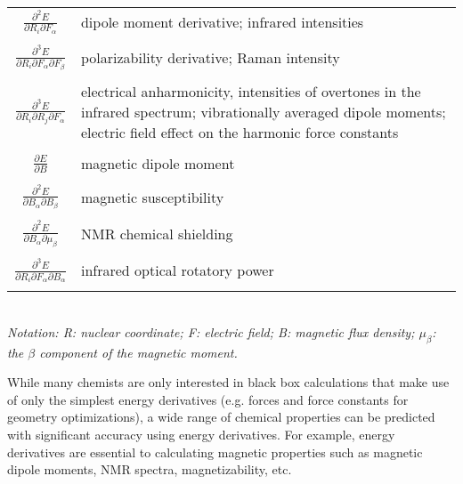\begin{table}
\begin{center}
\begin{tabular} {| c | p{13cm} | }
            $\frac{\partial^2 E}{\partial R_i \partial F_\alpha}$ & dipole moment derivative; infrared intensities \\ & \\
            $\frac{\partial^3 E}{\partial R_i \partial F_\alpha \partial F_\beta}$ & polarizability derivative; Raman intensity \\ & \\
            $\frac{\partial^3 E}{\partial R_i \partial R_j \partial F_\alpha}$ & electrical anharmonicity, intensities of overtones in the infrared spectrum; vibrationally averaged dipole moments; electric field effect on the harmonic force constants \\ & \\
            $\frac{\partial E}{\partial B}$ & magnetic dipole moment \\ & \\
            $\frac{\partial^2 E}{\partial B_\alpha \partial B_\beta}$ & magnetic susceptibility \\ & \\
            $\frac{\partial^2 E}{\partial B_\alpha \partial \mu_\beta}$ & NMR chemical shielding \\ & \\
            $\frac{\partial^3 E}{\partial R_i \partial F_\alpha \partial B_\alpha}$ & infrared optical rotatory power \\ & \\
            \hline
        \end{tabular} \\
        \bigskip
        \textit{Notation: R: nuclear coordinate; F: electric field; B: magnetic flux density; $\mu_{\beta}$: the $\beta$ component of the magnetic moment.}
    \end{center}
    \end{table}
    While many chemists are only interested in black box calculations that make use of only the simplest energy derivatives (e.g. forces and force constants for geometry optimizations), a wide range of chemical properties can be predicted with significant accuracy using energy derivatives. For example, energy derivatives are essential to calculating magnetic properties such as magnetic dipole moments, NMR spectra, magnetizability, etc.\cite{Pulay2014} 


